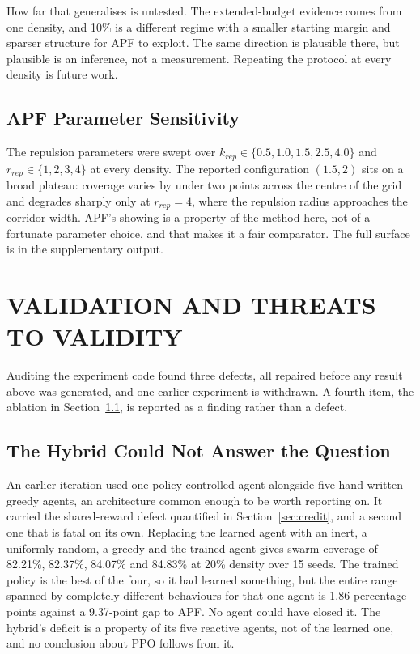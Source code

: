\documentclass[a4paper, 10pt, conference]{ieeeconf}
\begin{document}
How far that generalises is untested. The extended-budget evidence
comes from one density, and 10\% is a different regime with a smaller
starting margin and sparser structure for APF to exploit. The same
direction is plausible there, but plausible is an inference, not a
measurement. Repeating the protocol at every density is future work.

\subsection{APF Parameter Sensitivity}\label{sec:sweep}

The repulsion parameters were swept over $k_{rep} \in \{0.5, 1.0,
1.5, 2.5, 4.0\}$ and $r_{rep} \in \{1,2,3,4\}$ at every density. The reported configuration $(1.5, 2)$ sits on a broad plateau: coverage varies by under two points across the centre of the grid and degrades sharply only at $r_{rep}=4$, where the repulsion radius approaches the corridor width. APF's showing is a property of the method here, not of a fortunate parameter choice, and that makes it a fair comparator. The full surface is in the supplementary output.

\section{VALIDATION AND THREATS TO VALIDITY}\label{sec:validity}

Auditing the experiment code found three defects, all repaired before
any result above was generated, and one earlier experiment is
withdrawn. A fourth item, the ablation in
Section~\ref{sec:hybrid_ablation}, is reported as a finding rather
than a defect.

\subsection{The Hybrid Could Not Answer the Question}
\label{sec:hybrid_ablation}

An earlier iteration used one policy-controlled agent alongside five
hand-written greedy agents, an architecture common enough to be worth
reporting on. It carried the shared-reward defect quantified in
Section~\ref{sec:credit}, and a second one that is fatal on its own.
Replacing the learned agent with an inert, a uniformly random, a
greedy and the trained agent gives swarm coverage of 82.21\%, 82.37\%,
84.07\% and 84.83\% at 20\% density over 15 seeds. The trained policy
is the best of the four, so it had learned something, but the entire
range spanned by completely different behaviours for that one agent is
1.86 percentage points against a 9.37-point gap to APF. No agent could
have closed it. The hybrid's deficit is a property of its five
reactive agents, not of the learned one, and no conclusion about PPO
follows from it.
\end{document}
